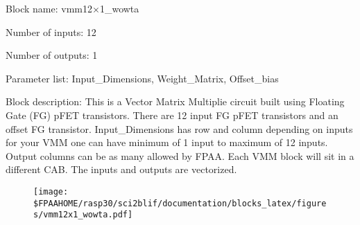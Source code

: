 \pagebreak
Block name: vmm12$\times$1\_wowta

Number of inputs: 12

Number of outputs: 1

Parameter list: Input\_Dimensions, Weight\_Matrix, Offset\_bias

Block description: 
This is a Vector Matrix Multiplie circuit built using Floating Gate (FG) pFET transistors. There are 12 input FG pFET transistors
and an offset FG transistor. Input\_Dimensions has row and column depending on inputs for your VMM one can have minimum of 1 input
to maximum of 12 inputs. Output columns can be as many allowed by FPAA. Each VMM block will sit in a different CAB. The inputs and
outputs are vectorized.

\begin{figure}[H]  %
\texttt{[image: \$FPAAHOME/rasp30/sci2blif/documentation/blocks\_latex/figures/vmm12x1\_wowta.pdf]}
\end{figure}

